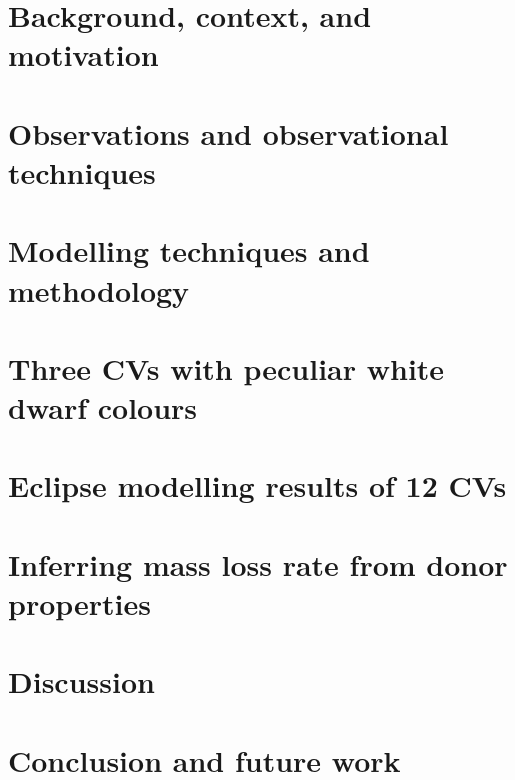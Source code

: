 \documentclass[a4paper,12pt,oneside,openright]{report}
\begin{document}
\begin{onehalfspace}


\chapter{Background, context, and motivation}


\chapter{Observations and observational techniques}


\chapter{Modelling techniques and methodology}


\chapter{Three CVs with peculiar white dwarf colours}


\chapter{Eclipse modelling results of 12 CVs}


\chapter{Inferring mass loss rate from donor properties}


\chapter{Discussion}


\chapter{Conclusion and future work}



\end{onehalfspace}

\begin{singlespace}




\end{singlespace}

\onehalfspacing
\appendix
\clearpage
\end{document}
